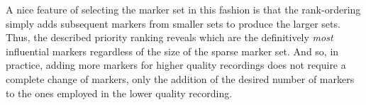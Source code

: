 A nice feature of selecting the marker set in this fashion is that the rank-ordering simply adds subsequent markers from smaller sets to produce the larger sets. Thus, the described priority ranking reveals which are the definitively \emph{most} influential markers regardless of the
size of the sparse marker set. And so, in practice, adding more markers for higher quality recordings does not require a complete change of markers, only the addition of the desired number of markers to the ones employed in the lower quality recording.







